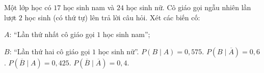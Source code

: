 \begin{ex}
Một lớp học có $17$ học sinh nam và $24$ học sinh nữ. Cô giáo gọi ngẫu nhiên lần lượt $2$ học sinh (có thứ tự) lên trả lời câu hỏi. Xét các biến cố:

$A$: ``Lần thứ nhất cô giáo gọi $1$ học sinh nam'';

$B$: ``Lần thứ hai cô giáo gọi $1$ học sinh nữ''.
\choiceTF
{$P(B\mid A)=0{,}575$.}
{$P\left(B\mid\overline A\right)=0{,}6$.}
{$P\left(\overline B\mid A\right)=0{,}425$.}
{$P\left(\overline B\mid\overline A\right)=0{,}4$.}
\end{ex}
